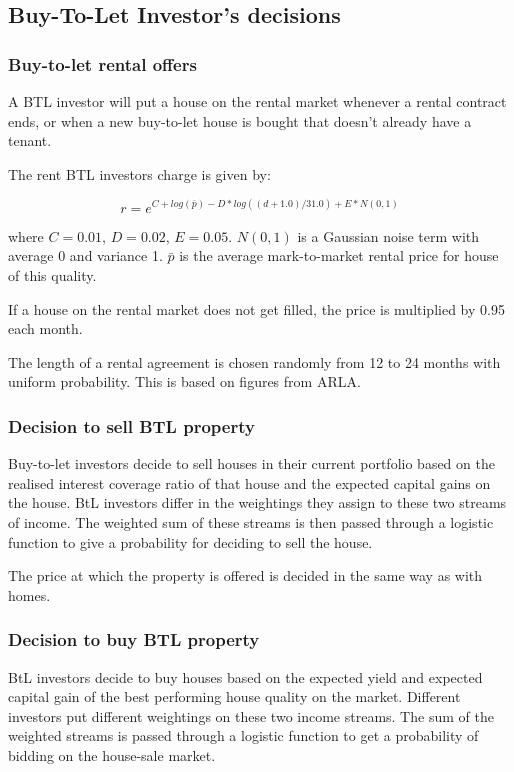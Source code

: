 \documentclass{article}
\begin{document}
\subsection{Buy-To-Let Investor's decisions}
\subsubsection{Buy-to-let rental offers}
A BTL investor will put a house on the rental market
whenever a rental contract ends, or when a new buy-to-let house is bought
that doesn't already have a tenant. 

The rent BTL investors charge is given by:

\begin{equation}
r=e^{C+log(\bar{p})-D\ast log((d+1.0)/31.0)+E\ast N(0,1)}
\end{equation}

\bigskip

where $C=0.01$, $D=0.02$, $E=0.05$. $N(0,1)$ is a Gaussian noise term with
average 0 and variance 1. $\bar{p}$ is the average mark-to-market rental
price for house of this quality.

If a house on the rental market does not get filled, the price is multiplied by 0.95 each month.

The length of a rental agreement is
chosen randomly from 12 to 24 months with uniform probability. This is based
on figures from ARLA.

\subsubsection{Decision to sell BTL property}

Buy-to-let investors decide to sell houses in their current portfolio based
on the realised interest coverage ratio of that house and the expected
capital gains on the house. BtL investors differ in the weightings they
assign to these two streams of income. The weighted sum of these streams is
then passed through a logistic function to give a probability for deciding
to sell the house.

The price at which the property is offered is decided in the same way as with homes.


\subsubsection{Decision to buy BTL property}

BtL investors decide to buy houses based on the expected yield and expected
capital gain of the best performing house quality on the market. Different
investors put different weightings on these two income streams. The sum of
the weighted streams is passed through a logistic function to get a
probability of bidding on the house-sale market.
\end{document}
